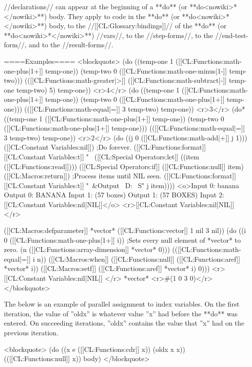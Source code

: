 //declarations// can appear at the beginning of a **do** (or **do<nowiki>*</nowiki>**) body. They apply to code in the **do** (or **do<nowiki>*</nowiki>**) body, to the //[[CL:Glossary:bindings]]// of the **do** (or **do<nowiki>*</nowiki>**) //vars//, to the //step-forms//, to the //end-test-form//, and to the //result-forms//.

====Examples====
<blockquote> 
(do ((temp-one 1 ([[CL:Functions:math-one-plus|1+]] temp-one)) 
     (temp-two 0 ([[CL:Functions:math-one-minus|1-]] temp-two)))
    (([[CL:Functions:math-greater|>]] ([[CL:Functions:math-subtract|-]] temp-one temp-two) 5) temp-one)) <r>4</r>
(do ((temp-one 1 ([[CL:Functions:math-one-plus|1+]] temp-one)) 
     (temp-two 0 ([[CL:Functions:math-one-plus|1+]] temp-one))) 
    (([[CL:Functions:math-equal|=]] 3 temp-two) temp-one)) <r>3</r>
(do* ((temp-one 1 ([[CL:Functions:math-one-plus|1+]] temp-one)) 
      (temp-two 0 ([[CL:Functions:math-one-plus|1+]] temp-one))) 
     (([[CL:Functions:math-equal|=]] 3 temp-two) temp-one)) <r>2</r>
(do ((j 0 ([[CL:Functions:math-add|+]] j 1))) 
    ([[CL:Constant Variables:nil]]) ;Do forever. 
  ([[CL:Functions:format]] [[CL:Constant Variables:t]] "~%
  ([[CL:Special Operators:let]] ((item ([[CL:Functions:read]])))
    ([[CL:Special Operators:if]] ([[CL:Functions:null]] item) 
        ([[CL:Macros:return]]) ;Process items until NIL seen. 
        ([[CL:Functions:format]] [[CL:Constant Variables:t]] "~&Output ~D: ~S" j item))))
<o>Input 0: banana
Output 0: BANANA
Input 1: (57 boxes)
Output 1: (57 BOXES)
Input 2: [[CL:Constant Variables:nil|NIL]]</o>
<r>[[CL:Constant Variables:nil|NIL]]</r>

([[CL:Macros:defparameter]] *vector* ([[CL:Functions:vector]] 1 nil 3 nil))
(do ((i 0 ([[CL:Functions:math-one-plus|1+]] i)) ;Sets every null element of *vector* to zero. 
     (n ([[CL:Functions:array-dimension]] *vector* 0)))
    (([[CL:Functions:math-equal|=]] i n))
  ([[CL:Macros:when]] ([[CL:Functions:null]] ([[CL:Functions:aref]] *vector* i))
    ([[CL:Macros:setf]] ([[CL:Functions:aref]] *vector* i) 0)))
<r>[[CL:Constant Variables:nil|NIL]] </r>
*vector* <r>#(1 0 3 0)</r>
</blockquote>

The below is an example of parallel assignment to index variables. On the first iteration, the value of ''oldx'' is whatever value ''x'' had before the **do** was entered. On succeeding iterations, ''oldx'' contains the value that ''x'' had on the previous iteration.

<blockquote>
(do ((x e ([[CL:Functions:cdr]] x)) 
     (oldx x x))
    (([[CL:Functions:null]] x))
  body) 
</blockquote> 

